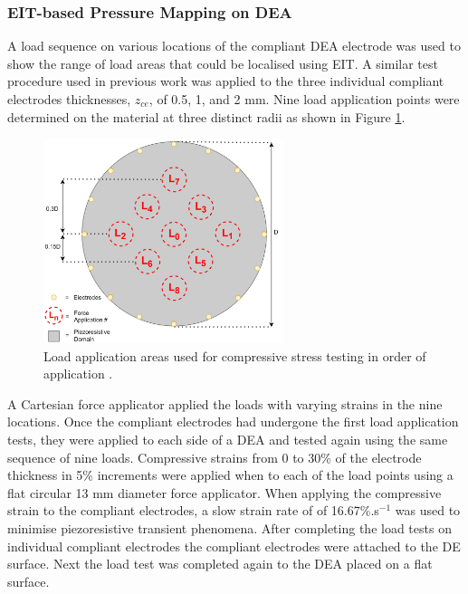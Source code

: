 \subsubsection{EIT-based Pressure Mapping on DEA}
\label{subsubsec:eit_test}
A load sequence on various locations of the compliant DEA electrode was used to show the range of load areas that could be localised using EIT. A similar test procedure used in previous work \cite{Ellingham2024} was applied to the three individual compliant electrodes thicknesses, $z_{ce}$, of 0.5, 1, and 2 mm. Nine load application points were determined on the material at three distinct radii as shown in Figure \ref{fig:force_app_map}.
\begin{figure}[H]
	\centering
	\includegraphics[width=7cm]{Figures/EIT_force_app_points_v3.11.jpg}
	\vspace{0.2cm}
	\caption{Load application areas used for compressive stress testing in order of application \cite{Ellingham2024}.}
	\label{fig:force_app_map}
\end{figure}
A Cartesian force applicator applied the loads with varying strains in the nine locations. Once the compliant electrodes had undergone the first load application tests, they were applied to each side of a DEA and tested again using the same sequence of nine loads. Compressive strains from 0 to 30\% of the electrode thickness in 5\% increments were applied when to each of the load points using a flat circular 13 mm diameter force applicator. When applying the compressive strain to the compliant electrodes, a slow strain rate of of 16.67\%.s$^{-1}$ was used to minimise piezoresistive transient phenomena. After completing the load tests on individual compliant electrodes the compliant electrodes were attached to the DE surface. Next the load test was completed again to the DEA placed on a flat surface.

